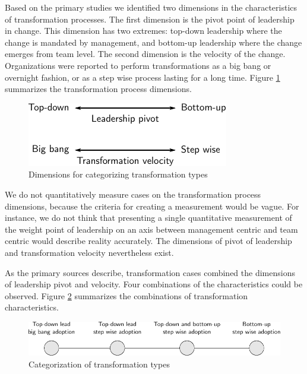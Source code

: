 \documentclass[preprint,authoryear,12pt]{elsarticle}
\begin{document}
Based on the primary studies we identified two dimensions in the characteristics
of transformation processes. The first dimension is the pivot point of
leadership in change. This dimension has two extremes: top-down leadership where
the change is mandated by management, and bottom-up leadership where the change
emerges from team level. The second dimension is the velocity of the change.
Organizations were reported to perform transformations as a big bang or
overnight fashion, or as a step wise process lasting for a long time. Figure
\ref{fig:transformation_dimensions} summarizes the transformation process
dimensions.

\begin{figure}[h]
  \begin{center}
    \includegraphics{graphics/transformation_dimensions.pdf}
    \caption{Dimensions for categorizing transformation types}
    \label{fig:transformation_dimensions}
  \end{center}
\end{figure}

We do not quantitatively measure cases on the transformation process dimensions,
because the criteria for creating a measurement would be vague. For instance, we
do not think that presenting a single quantitative measurement of the weight
point of leadership on an axis between management centric and team centric would
describe reality accurately. The dimensions of pivot of leadership and
transformation velocity nevertheless exist.

As the primary sources describe, transformation cases combined the dimensions of
leadership pivot and velocity. Four combinations of the characteristics could be
observed. Figure \ref{fig:transformation_types} summarizes the combinations of
transformation characteristics.

\begin{figure}[h]
  \begin{center}
    \includegraphics[width=1\textwidth]{graphics/transformation_process.pdf}
    \caption{Categorization of transformation types}
    \label{fig:transformation_types}
  \end{center}
\end{figure}
\end{document}
